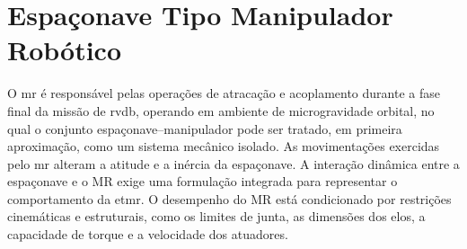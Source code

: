 \section{Espaçonave Tipo Manipulador Robótico}
\label{sec_manipulador_robotico}

O \gls{mr} é responsável pelas operações de atracação e acoplamento durante a fase final da missão de \gls{rvdb}, operando em ambiente de microgravidade orbital, no qual o conjunto espaçonave--manipulador pode ser tratado, em primeira aproximação, como um sistema mecânico isolado.
As movimentações exercidas pelo \gls{mr} alteram a atitude e a inércia da espaçonave.
A interação dinâmica entre a espaçonave e o MR exige uma formulação integrada para representar o comportamento da \gls{etmr}.
O desempenho do MR está condicionado por restrições cinemáticas e estruturais, como os limites de junta, as dimensões dos elos, a capacidade de torque e a velocidade dos atuadores.























